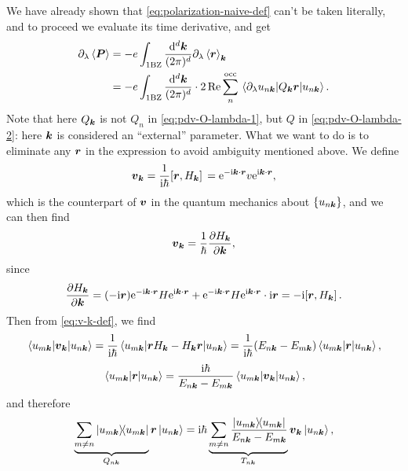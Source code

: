 \documentclass[hyperref, a4paper]{article}
\newcommand*{\ii}{\mathrm{i}}
\newcommand*{\ee}{\mathrm{e}}
\begin{document}
We have already shown that \eqref{eq:polarization-naive-def} can't be taken literally, 
and to proceed we evaluate its time derivative, and get 
\begin{equation}
    \begin{aligned}
        \partial_\lambda \expval{\vb*{P}} &= 
        - e \int_{\text{1BZ}} \frac{\dd[d]{\vb*{k}}}{(2\pi)^d} 
        \partial_\lambda \expval{\vb*{r}}_{\vb*{k}} \\
        &= - e \int_{\text{1BZ}} \frac{\dd[d]{\vb*{k}}}{(2\pi)^d} 
        \cdot 2 \Re \sum_{n}^{\text{occ}} \mel{\partial_\lambda u_{n \vb*{k}}}{Q_{\vb*{k}} \vb*{r}}{u_{n \vb*{k}}}.
    \end{aligned}
    \label{eq:change-of-p-1}
\end{equation}
Note that here $Q_{\vb*{k}}$ is not $Q_{n}$ in \eqref{eq:pdv-O-lambda-1},
but $Q$ in \eqref{eq:pdv-O-lambda-2}: 
here $\vb*{k}$ is considered an ``external'' parameter.
What we want to do is to eliminate any $\vb*{r}$ in the expression 
to avoid ambiguity mentioned above. 
We define 
\begin{equation}
    \vb*{v}_{\vb*{k}} = \frac{1}{\ii \hbar} \comm*{\vb*{r}}{H_{\vb*{k}}}
    = \ee^{- \ii \vb*{k} \cdot \vb*{r}} v \ee^{\ii \vb*{k} \cdot \vb*{r}},
    \label{eq:v-k-def}
\end{equation}
which is the counterpart of $\vb*{v}$ 
in the quantum mechanics about $\{u_{n \vb*{k}}\}$,
and we can then find 
\begin{equation}
    \vb*{v}_{\vb*{k}} = \frac{1}{\hbar} \pdv{H_{\vb*{k}}}{\vb*{k}},
    \label{eq:v-is-pdv-h-k}
\end{equation}
since 
\[
    \pdv{H_{\vb*{k}}}{\vb*{k}}
    = (- \ii \vb*{r}) \ee^{- \ii \vb*{k} \cdot \vb*{r}}  H \ee^{\ii \vb*{k} \cdot \vb*{r}}
    + \ee^{- \ii \vb*{k} \cdot \vb*{r}} H \ee^{\ii \vb*{k} \cdot \vb*{r}} \cdot \ii \vb*{r}
    = - \ii \comm*{\vb*{r}}{H_{\vb*{k}}} .
\]
Then from \eqref{eq:v-k-def}, we find 
\[
    \mel{u_{m \vb*{k}}}{\vb*{v}_{\vb*{k}}}{u_{n \vb*{k}}}
    = \frac{1}{\ii \hbar} \mel{u_{m \vb*{k}}}{\vb*{r} H_{\vb*{k}} - H_{\vb*{k}} \vb*{r}}{u_{n \vb*{k}}}
    = \frac{1}{\ii \hbar} (E_{n \vb*{k}} - E_{m \vb*{k}}) 
    \mel{u_{m \vb*{k}}}{\vb*{r}}{u_{n \vb*{k}}},
\]
\[
    \mel{u_{m \vb*{k}}}{\vb*{r}}{u_{n \vb*{k}}} = \frac{\ii \hbar}{E_{n \vb*{k}} - E_{m \vb*{k}}}
    \mel{u_{m \vb*{k}}}{\vb*{v}_{\vb*{k}}}{u_{n \vb*{k}}},
\]
and therefore 
\[
    \underbrace{\sum_{m \neq n} \dyad{u_{m \vb*{k}}}}_{Q_{n \vb*{k}}} \vb*{r} \ket{u_{n \vb*{k}}}
    = \ii \hbar \underbrace{
        \sum_{m \neq n} \frac{\dyad{u_{m \vb*{k}}}}{E_{n \vb*{k}} - E_{m \vb*{k}}} 
    }_{T_{n \vb*{k}}}
    \vb*{v}_{\vb*{k}} \ket{u_{n \vb*{k}}},
\]
\end{document}

